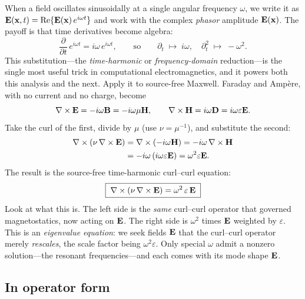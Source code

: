 When a field oscillates sinusoidally at a single angular frequency $\omega$, we
write it as $\mathbf{E}(\mathbf{x},t) = \operatorname{Re}\{\mathbf{E}(\mathbf{x})\,e^{i\omega t}\}$ and work with the
complex \emph{phasor} amplitude $\mathbf{E}(\mathbf{x})$. The payoff is that time derivatives
become algebra:
\begin{equation}
  \frac{\partial}{\partial t}\,e^{i\omega t} = i\omega\,e^{i\omega t},
  \qquad\text{so}\qquad
  \partial_t \;\longmapsto\; i\omega,\quad
  \partial_t^2 \;\longmapsto\; -\omega^2 .
  \label{eq:harmonic-rule}
\end{equation}
This substitution---the \emph{time-harmonic} or \emph{frequency-domain}
reduction---is the single most useful trick in computational electromagnetics,
and it powers both this analysis and the next. Apply it to source-free Maxwell.
Faraday and Amp\`ere, with no current and no charge, become
\begin{equation}
  \nabla\times\mathbf{E} = -i\omega\mathbf{B} = -i\omega\mu\mathbf{H},
  \qquad
  \nabla\times\mathbf{H} = i\omega\mathbf{D} = i\omega\varepsilon\mathbf{E}.
\end{equation}
Take the curl of the first, divide by $\mu$ (use $\nu=\mu^{-1}$), and substitute
the second:
\begin{align}
  \nabla\times(\nu\,\nabla\times\mathbf{E})
    &= \nabla\times(-i\omega\mathbf{H})
     = -i\omega\,\nabla\times\mathbf{H} \notag\\
    &= -i\omega\,(i\omega\varepsilon\mathbf{E})
     = \omega^2\varepsilon\mathbf{E}.
\end{align}
The result is the source-free time-harmonic curl--curl equation:
\begin{equation}
  \boxed{\;\nabla\times(\nu\,\nabla\times\mathbf{E}) = \omega^2\,\varepsilon\,\mathbf{E}\;}
  \label{eq:eigen-pde}
\end{equation}
Look at what this is. The left side is the \emph{same} curl--curl operator that
governed magnetostatics, now acting on $\mathbf{E}$. The right side is $\omega^2$ times
$\mathbf{E}$ weighted by $\varepsilon$. This is an \emph{eigenvalue equation}: we seek
fields $\mathbf{E}$ that the curl--curl operator merely \emph{rescales}, the scale
factor being $\omega^2\varepsilon$. Only special $\omega$ admit a nonzero
solution---the resonant frequencies---and each comes with its mode shape $\mathbf{E}$.

\subsection{In operator form}
\label{sec:eigen-operatorform}

